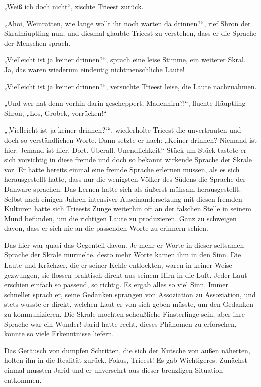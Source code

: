 „Weiß ich doch nicht“, zischte Trieest zurück.

„Ahoi, Weinratten, wie lange wollt ihr noch warten da drinnen?“, rief Shron der Skralhäuptling nun, und diesmal glaubte Trieest zu verstehen, dass er die Sprache der Menschen sprach.

„Vielleicht ist ja keiner drinnen?“, sprach eine leise Stimme, ein weiterer Skral. Ja, das waren wiederum eindeutig nichtmenschliche Laute!

„Vielleicht ist ja keiner drinnen?“, versuchte Trieest leise, die Laute nachzuahmen.

„Und wer hat denn vorhin darin gescheppert, Madenhirn?!“, fluchte Häuptling Shron, „Los, Grobek, vorrücken!“

„‚Vielleicht ist ja keiner drinnen?‘“, wiederholte Trieest die unvertrauten und doch so verständlichen Worte. Dann setzte er nach: „Keiner drinnen? Niemand ist hier. Jemand ist hier. Dort. Überall. Unendlichkeit.“ Stück um Stück tastete er sich vorsichtig in diese fremde und doch so bekannt wirkende Sprache der Skrale vor. Er hatte bereits einmal eine fremde Sprache erlernen müssen, als es sich herausgestellt hatte, dass nur die wenigsten Völker des Südens die Sprache der Danware sprachen. Das Lernen hatte sich als äußerst mühsam herausgestellt. Selbst nach einigen Jahren intensiver Auseinandersetzung mit diesen fremden Kulturen hatte sich Trieests Zunge weiterhin oft an der falschen Stelle in seinem Mund befunden, um die richtigen Laute zu produzieren. Ganz zu schweigen davon, dass er sich nie an die passenden Worte zu erinnern schien.

Das hier war quasi das Gegenteil davon. Je mehr er Worte in dieser seltsamen Sprache der Skrale murmelte, desto mehr Worte kamen ihm in den Sinn. Die Laute und Krächzer, die er seiner Kehle entlockten, waren in keiner Weise gezwungen, sie flossen praktisch direkt aus seinem Hirn in die Luft. Jeder Laut erschien einfach so passend, so richtig. Es ergab alles so viel Sinn. Immer schneller sprach er, seine Gedanken sprangen von Assoziation zu Assoziation, und stets wusste er direkt, welchen Laut er von sich geben müsste, um den Gedanken zu kommunizieren. Die Skrale mochten scheußliche Finsterlinge sein, aber ihre Sprache war ein Wunder! Jarid hatte recht, dieses Phänomen zu erforschen, könnte so viele Erkenntnisse liefern.

Das Geräusch von dumpfen Schritten, die sich der Kutsche von außen näherten, holten ihn in die Realität zurück. Fokus, Trieest! Es gab Wichtigeres. Zunächst einmal mussten Jarid und er unversehrt aus dieser brenzligen Situation entkommen.

